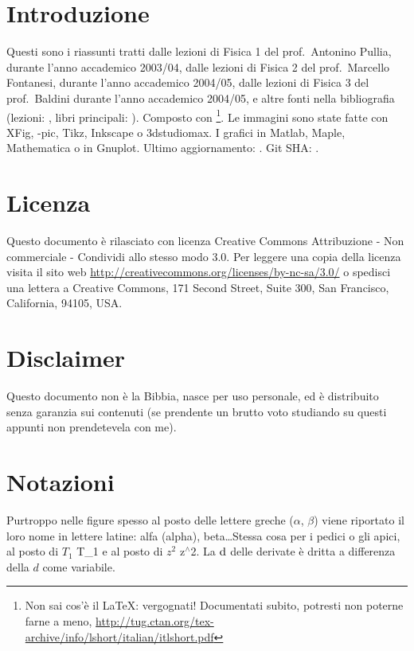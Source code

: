 \sffamily\itshape
\section*{\centering Introduzione}

Questi sono i riassunti tratti dalle lezioni di Fisica 1 del %
prof.~Antonino Pullia, durante l'anno accademico 2003/04, dalle lezioni di Fisica 2 del prof.~Marcello Fontanesi, durante l'anno accademico 2004/05, dalle lezioni di Fisica 3 del prof.~Baldini durante l'anno accademico 2004/05, e altre fonti nella bibliografia (lezioni: \cite{Pullia, Fontanesi, Baldini, Paganoni, Lucchini, Franzoni, Monica, Barney, Maddalena}, libri principali: \cite{Fisica1, Feynm, modern, elettro, ottica, enge, alonso, jackson, mazzoldi}). Composto con \LaTeXe\footnote{Non sai cos'è il \LaTeX: vergognati! Documentati subito, potresti non poterne farne a meno, \href{http://tug.ctan.org/info/lshort/italian/it-lshort.pdf}{http://tug.ctan.org/tex-archive/info/lshort/italian/itlshort.pdf}}. Le immagini sono state fatte con XFig, \Xy-pic, Tikz, Inkscape o 3dstudiomax. I grafici in Matlab, Maple, Mathematica o in Gnuplot.
\newline\newline
Ultimo aggiornamento: \gitAuthorDate. Git SHA: \texttt{\gitAbbrevHash}.

\section*{\centering Licenza}
Questo documento è rilasciato con licenza Creative Commons Attribuzione - Non commerciale - Condividi allo stesso modo 3.0. Per leggere una copia della licenza visita il sito web \url{http://creativecommons.org/licenses/by-nc-sa/3.0/} o spedisci una lettera a Creative Commons, 171 Second Street, Suite 300, San Francisco, California, 94105, USA. \ccbyncsaeu

\section*{\centering Disclaimer}
Questo documento non è la Bibbia, nasce per uso personale, ed è distribuito senza garanzia sui contenuti (se prendente un brutto voto studiando su questi appunti non prendetevela con me).
\section*{\centering Notazioni}
Purtroppo nelle figure spesso al posto delle lettere greche ($\alpha$, $\beta$) viene riportato il loro nome in lettere latine: alfa (alpha), beta\ldots Stessa cosa per i pedici o gli apici, al posto di $T_1$ T\_1 e al posto di $z^2$ z$^\wedge$2. La $\mathrm{d}$ delle derivate è dritta a differenza della $d$ come variabile.
\newpage
